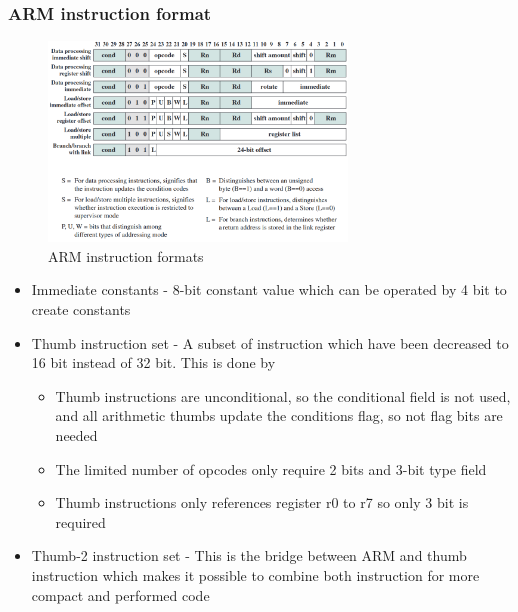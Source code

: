 \documentclass[12pt, a4paper]{article}
\begin{document}
			\subsubsection{ARM instruction format}
				\begin{figure}[h!]
					\includegraphics[width=300px]{assets/ARMInstructionFormat.png}
					\centering
					\caption{ARM instruction formats}
				\end{figure}
				\begin{itemize}
					\item Immediate constants - 8-bit constant value which can be operated by 4 bit to create constants
					\item Thumb instruction set - A subset of instruction which have been decreased to 16 bit instead of 32 bit. This is done by
						\begin{itemize}
							\item Thumb instructions are unconditional, so the conditional field is not used, and all arithmetic thumbs update the conditions flag, so not flag bits are needed
							\item The limited number of opcodes only require 2 bits and 3-bit type field
							\item Thumb instructions only references register r0 to r7 so only 3 bit is required
						\end{itemize}
					\item Thumb-2 instruction set - This is the bridge between ARM and thumb instruction which makes it possible to combine both instruction for more compact and performed code
				\end{itemize}
\end{document}
